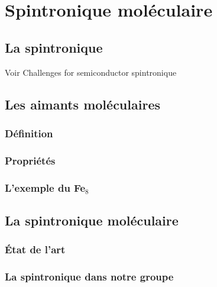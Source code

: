 \chapter{Spintronique moléculaire}

\section{La spintronique}

Voir Challenges for semiconductor spintronique
\section{Les aimants moléculaires} 
\subsection{Définition}
\subsection{Propriétés}
\subsection{L'exemple du Fe$_8$}

\section{La spintronique moléculaire}
\subsection{État de l'art}
\subsection{La spintronique dans notre groupe}